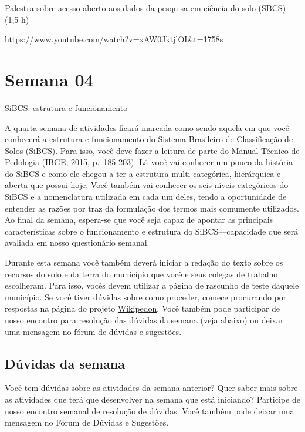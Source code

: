 \documentclass[
  11pt,
  a4paper,
  dvipsnames]{tufte-book}
\begin{document}
Palestra sobre acesso aberto aos dados da pesquisa em ciência do solo (SBCS) (1,5 h)

\url{https://www.youtube.com/watch?v=xAW0JktjlOI\&t=1758s}

\hypertarget{semana-04}{%
\chapter{Semana 04}\label{semana-04}}

SiBCS: estrutura e funcionamento

A quarta semana de atividades ficará marcada como sendo aquela em que você conhecerá a estrutura e funcionamento do Sistema Brasileiro de Classificação de Solos (\href{https://www.embrapa.br/en/solos/sibcs}{SiBCS}). Para isso, você deve fazer a leitura de parte do Manual Técnico de Pedologia (IBGE, 2015, p.~185-203). Lá você vai conhecer um pouco da história do SiBCS e como ele chegou a ter a estrutura multi categórica, hierárquica e aberta que possui hoje. Você também vai conhecer os seis níveis categóricos do SiBCS e a nomenclatura utilizada em cada um deles, tendo a oportunidade de entender as razões por traz da formulação dos termos mais comumente utilizados. Ao final da semana, espera-se que você seja capaz de apontar as principais características sobre o funcionamento e estrutura do SiBCS---capacidade que será avaliada em nosso questionário semanal.

Durante esta semana você também deverá iniciar a redação do texto sobre os recursos do solo e da terra do município que você e seus colegas de trabalho escolheram. Para isso, vocês devem utilizar a página de rascunho de teste daquele município. Se você tiver dúvidas sobre como proceder, comece procurando por respostas na página do projeto \href{https://pt.wikiversity.org/wiki/Wikipedon}{Wikipedon}. Você também pode participar de nosso encontro para resolução das dúvidas da semana (veja abaixo) ou deixar uma mensagem no \href{https://moodle.utfpr.edu.br/mod/forum/view.php?id=573329}{fórum de dúvidas e sugestões}.

\hypertarget{duxfavidas-da-semana-2}{%
\section{Dúvidas da semana}\label{duxfavidas-da-semana-2}}

Você tem dúvidas sobre as atividades da semana anterior? Quer saber mais sobre as atividades que terá que desenvolver na semana que está iniciando? Participe de nosso encontro semanal de resolução de dúvidas. Você também pode deixar uma mensagem no Fórum de Dúvidas e Sugestões.
\end{document}
